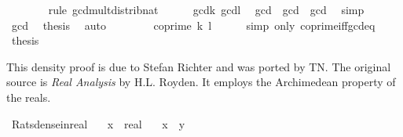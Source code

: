 \begin{isabellebody}
\ \ \ \ \ \ \isamarkupfalse%
\ {\isacharparenleft}{\kern0pt}rule\ gcd{\isacharunderscore}{\kern0pt}mult{\isacharunderscore}{\kern0pt}distrib{\isacharunderscore}{\kern0pt}nat{\isacharparenright}{\kern0pt}\isanewline
\ \ \ \ \isamarkupfalse%
\ gcd{\isacharunderscore}{\kern0pt}k\ gcd{\isacharunderscore}{\kern0pt}l\ \isamarkupfalse%
\ {\isachardoublequoteopen}{\isacharquery}{\kern0pt}gcd\ {\isacharasterisk}{\kern0pt}\ {\isacharquery}{\kern0pt}gcd{\isacharprime}{\kern0pt}\ {\isacharequal}{\kern0pt}\ {\isacharquery}{\kern0pt}gcd{\isachardoublequoteclose}\ \isamarkupfalse%
\ simp\isanewline
\ \ \ \ \isamarkupfalse%
\ gcd\ \isamarkupfalse%
\ {\isacharquery}{\kern0pt}thesis\ \isamarkupfalse%
\ auto\isanewline
\ \ \isamarkupfalse%
\isanewline
\ \ \isamarkupfalse%
\ \isamarkupfalse%
\ {\isachardoublequoteopen}coprime\ {\isacharquery}{\kern0pt}k\ {\isacharquery}{\kern0pt}l{\isachardoublequoteclose}\isanewline
\ \ \ \ \isamarkupfalse%
\ {\isacharparenleft}{\kern0pt}simp\ only{\isacharcolon}{\kern0pt}\ coprime{\isacharunderscore}{\kern0pt}iff{\isacharunderscore}{\kern0pt}gcd{\isacharunderscore}{\kern0pt}eq{\isacharunderscore}{\kern0pt}{}{\isacharparenright}{\kern0pt}\isanewline
\ \ \isamarkupfalse%
\ \isamarkupfalse%
\ {\isacharquery}{\kern0pt}thesis\ \isacommand{{\isachardot}{\kern0pt}{\isachardot}{\kern0pt}}\isamarkupfalse%
\isanewline
{}\isamarkupfalse%
%
\endisatagproof
{\isafoldproof}%
%
\isadelimproof
%
\endisadelimproof
%
\isadelimdocument
%
\endisadelimdocument
%
\isatagdocument
%
\isamarkuptrue%
%
\endisatagdocument
{\isafolddocument}%
%
\isadelimdocument
%
\endisadelimdocument
%
\begin{isamarkuptext}%
This density proof is due to Stefan Richter and was ported by TN.  The
  original source is \emph{Real Analysis} by H.L. Royden.
  It employs the Archimedean property of the reals.%
\end{isamarkuptext}\isamarkuptrue%
\isamarkupfalse%
\ Rats{\isacharunderscore}{\kern0pt}dense{\isacharunderscore}{\kern0pt}in{\isacharunderscore}{\kern0pt}real{\isacharcolon}{\kern0pt}\isanewline
\ \ \ x\ {\isacharcolon}{\kern0pt}{\isacharcolon}{\kern0pt}\ real\isanewline
\ \ \ {\isachardoublequoteopen}x\ {\isacharless}{\kern0pt}\ y{\isachardoublequoteclose}\isanewline

\end{isabellebody}
